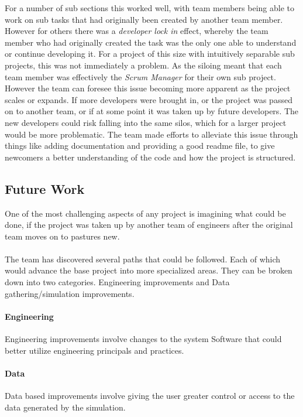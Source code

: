 \documentclass[11pt]{article}
\begin{document}
{\begin{enumerate}
	For a number of sub sections this worked well, with team members being able to work on sub tasks that had originally been created by another team member. However for others there was a \textit{developer lock in} effect, whereby the team member who had originally created the task was the only one able to understand or continue developing it. For a project of this size with intuitively separable sub projects, this was not immediately a problem. As the siloing meant that each team member was effectively the \textit{Scrum Manager} for their own sub project. However the team can foresee this issue becoming more apparent as the project scales or expands. If more developers were brought in, or the project was passed on to another team, or if at some point it was taken up by future developers. The new developers could risk falling into the same silos, which for a larger project would be more problematic. The team made efforts to alleviate this issue through things like adding documentation and providing a good readme file, to give newcomers a better understanding of the code and how the project is structured.
	
	
\end{enumerate}


\pagebreak
\subsection{Future Work} 
One of the most challenging aspects of any project is imagining what could be done, if the project was taken up by another team of engineers after the original team moves on to pastures new.
\\~\\
The team has discovered several paths that could be followed. Each of which would advance the base project into more specialized areas.
They can be broken down into two categories. Engineering improvements and Data gathering/simulation improvements.

\paragraph{Engineering}
Engineering improvements involve changes to the system Software that could better utilize engineering principals and practices.

\paragraph{Data}
Data based improvements involve giving the user greater control or access to the data generated by the simulation.\\

}
\end{document}

